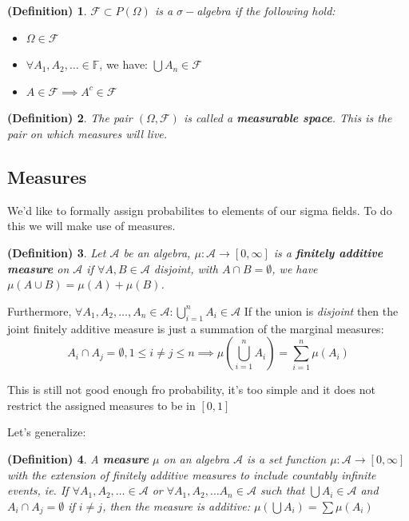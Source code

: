 \documentclass{article}
\newtheorem{definition}{(Definition)}
\begin{document}
\begin{definition}
$\mathcal{F} \subset P(\Omega)$ is a $\sigma-$algebra if the following hold:
\end{definition}
\begin{itemize}
\item $\Omega \in \mathcal{F}$
\item $\forall A_1, A_2, \dots \in \mathbb{F}$, we have: $ \bigcup A_n \in \mathcal{F}$
\item $A \in \mathcal{F} \implies A^c \in \mathcal{F}$
\end{itemize}

\begin{definition}
The pair $(\Omega, \mathcal{F})$ is called a \textbf{measurable space}. This is the pair on which measures will live. 
\end{definition}

\subsection{Measures}
We'd like to formally assign probabilites to elements of our sigma fields. To do this we will make use of measures.

\begin{definition}
Let $\mathcal{A}$ be an algebra, $ \mu : \mathcal{A} \rightarrow [0, \infty]$ is a \textbf{finitely additive measure} on $\mathcal{A}$ if $\forall A, B \in \mathcal{A}$ disjoint, with  $A \cap B = \emptyset$, we have $\mu (A \cup B) = \mu (A) + \mu(B)$. 
\end{definition}

Furthermore, $\forall A_1, A_2, \dots, A_n \in \mathcal{A} : \bigcup_{i=1}^n A_i \in \mathcal{A} $ If the union is \textit{disjoint} then the joint finitely additive measure is just a summation of the marginal measures:
\[ A_i \cap A_j = \emptyset, 1 \leq i \neq j \leq n \implies \mu(\bigcup_{i=1}^n A_i) = \sum_{i=1}^n \mu(A_i)
\]

This is still not good enough fro probability, it's too simple and it does not restrict the assigned measures to be in $[0,1]$

Let's generalize: 

\begin{definition}
A \textbf{measure} $\mu$ on an algebra $\mathcal{A} $ is a set function $\mu: \mathcal{A} \rightarrow [0,\infty]$ with the extension of finitely additive measures to include countably infinite events, ie. If $\forall A_1, A_2, \dots \in \mathcal{A}$ or $\forall A_1, A_2, \dots A_n \in \mathcal{A}$ such that $\bigcup A_i \in \mathcal{A}$ and $A_i \cap A_j = \emptyset$ if $i \neq j$, then the measure is additive: $\mu(\bigcup A_i) = \sum \mu(A_i)$
\end{definition}
\end{document}
